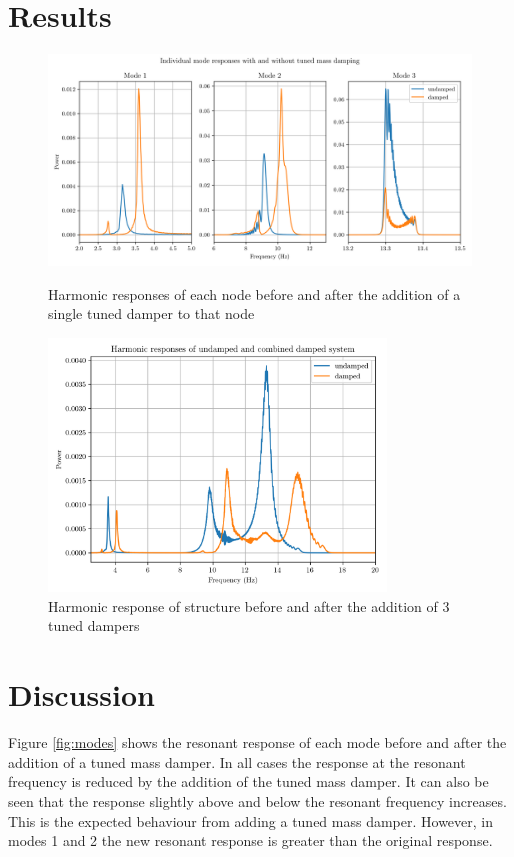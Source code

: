 \documentclass[8pt]{article}
\begin{document}
\newpage

\section{Results}

\begin{figure}[H]
    
    \centering
    \includegraphics[width=1\textwidth]{modes.png}
    \caption{\label{fig:modes} Harmonic responses of each node before and after the addition of a single tuned damper to that node}
    \includegraphics[width=0.8\textwidth]{combined_full_sweep.png}
    \caption{\label{fig:combined_full_sweep} Harmonic response of structure before and after the addition of 3 tuned dampers}
\end{figure}

\newpage
\section{Discussion}

Figure \ref{fig:modes} shows the resonant response of each mode before and after the addition of a tuned mass damper.
In all cases the response at the resonant frequency is reduced by the addition of the tuned mass damper. It can also be seen that the
response slightly above and below the resonant frequency increases. This is the expected behaviour from adding a tuned mass damper.
However, in modes 1 and 2 the new resonant response is greater than the original response.
\end{document}
